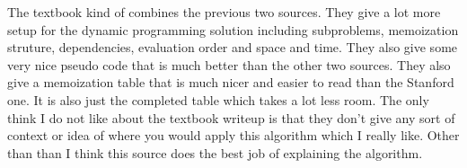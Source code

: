 \documentclass{article}
\begin{document}
	The textbook kind of combines the previous two sources. They give a lot more setup for the dynamic programming solution including subproblems, memoization struture, dependencies, evaluation order and space and time. They also give some very nice pseudo code that is much better than the other two sources. They also give a memoization table that is much nicer and easier to read than the Stanford one. It is also just the completed table which takes a lot less room. The only think I do not like about the textbook writeup is that they don't give any sort of context or idea of where you would apply this algorithm which I really like. Other than than I think this source does the best job of explaining the algorithm.
\end{document}
